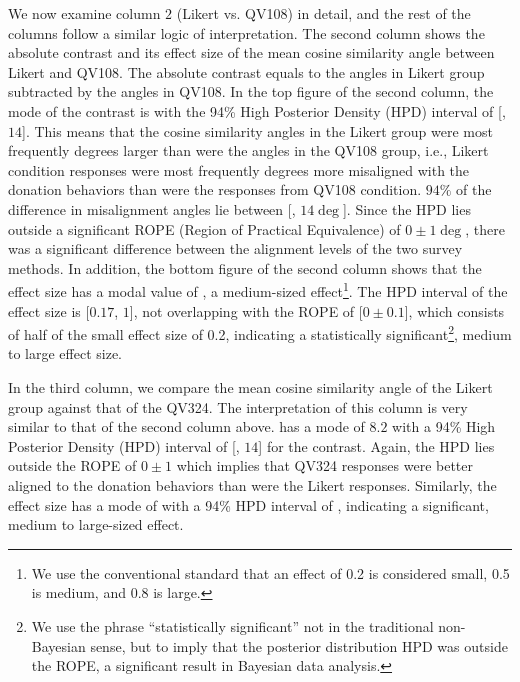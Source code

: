 We now examine column $2$ (Likert vs. QV108) in detail, and the rest of the columns follow a similar logic of interpretation. The second column shows the absolute contrast and its effect size of the mean cosine similarity angle between Likert and QV108. The absolute contrast equals to the angles in Likert group subtracted by the angles in QV108. In the top figure of the second column, the mode of the contrast is {} with the 94\% High Posterior Density (HPD) interval of [{}, $14$]. This means that the cosine similarity angles in the Likert group were most frequently {} degrees larger than were the angles in the QV108 group, i.e., Likert condition responses were most frequently {} degrees more misaligned with the donation behaviors than were the responses from QV108 condition. $94\%$ of the difference in misalignment angles lie between [{\change{$2.6 \deg$}}, $14 \deg$]. Since the HPD lies outside a significant ROPE (Region of Practical Equivalence) of $0 \pm 1 \deg$, there was a significant difference between the alignment levels of the two survey methods. In addition, the bottom figure of the second column shows that the effect size has a modal value of {}, a medium-sized effect\footnote{We use the conventional standard that an effect of 0.2 is considered small, 0.5 is medium, and 0.8 is large.}. The HPD interval of the effect size is [$0.17$, $1$], not overlapping with the ROPE of [$0 \pm 0.1$], which consists of half of the small effect size of 0.2, indicating a statistically significant\footnote{We use the phrase ``statistically significant'' not in the traditional non-Bayesian sense, but to imply that the posterior distribution HPD was outside the ROPE, a significant result in Bayesian data analysis.}, medium to large effect size.

In the third column, we compare the mean cosine similarity angle of the Likert group
against that of the QV324. The interpretation of this column is very similar to that of the second column above. {} has a mode of $8.2$ with a 94\% High Posterior Density (HPD) interval of [{}, $14$] for the contrast. Again, the HPD lies outside the ROPE of $0 \pm 1$ which implies that QV324 responses were better aligned to the donation behaviors than were the Likert responses. Similarly, the effect size has a mode of {} with a 94\% HPD interval of {\change{[$0.16$, $0.96$]}}, indicating a significant, medium to large-sized effect.

